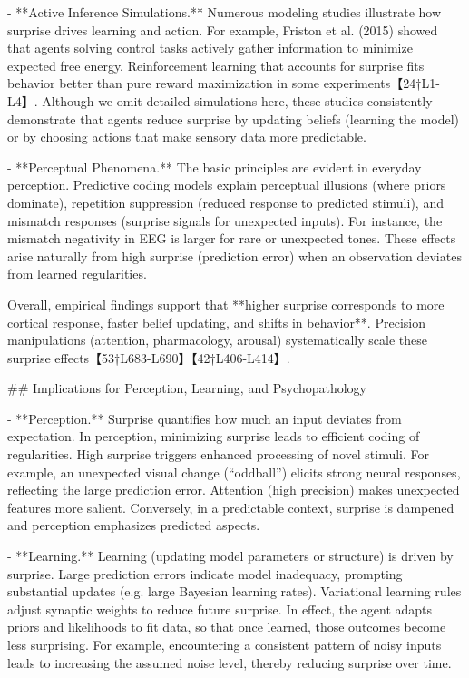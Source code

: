 \documentclass[a4paper]{article}
\begin{document}
    - **Active Inference Simulations.**  Numerous modeling studies illustrate how surprise drives learning and action.  For example, Friston et al. (2015) showed that agents solving control tasks actively gather information to minimize expected free energy.  Reinforcement learning that accounts for surprise fits behavior better than pure reward maximization in some experiments【24†L1-L4】.  Although we omit detailed simulations here, these studies consistently demonstrate that agents reduce surprise by updating beliefs (learning the model) or by choosing actions that make sensory data more predictable.
    
    - **Perceptual Phenomena.**  The basic principles are evident in everyday perception.  Predictive coding models explain perceptual illusions (where priors dominate), repetition suppression (reduced response to predicted stimuli), and mismatch responses (surprise signals for unexpected inputs).  For instance, the mismatch negativity in EEG is larger for rare or unexpected tones.  These effects arise naturally from high surprise (prediction error) when an observation deviates from learned regularities.
    
    Overall, empirical findings support that **higher surprise corresponds to more cortical response, faster belief updating, and shifts in behavior**.  Precision manipulations (attention, pharmacology, arousal) systematically scale these surprise effects【53†L683-L690】【42†L406-L414】.
    
    ## Implications for Perception, Learning, and Psychopathology
    
    - **Perception.**  Surprise quantifies how much an input deviates from expectation.  In perception, minimizing surprise leads to efficient coding of regularities.  High surprise triggers enhanced processing of novel stimuli.  For example, an unexpected visual change (“oddball”) elicits strong neural responses, reflecting the large prediction error.  Attention (high precision) makes unexpected features more salient.  Conversely, in a predictable context, surprise is dampened and perception emphasizes predicted aspects.
    
    - **Learning.**  Learning (updating model parameters or structure) is driven by surprise.  Large prediction errors indicate model inadequacy, prompting substantial updates (e.g. large Bayesian learning rates).  Variational learning rules adjust synaptic weights to reduce future surprise.  In effect, the agent adapts priors and likelihoods to fit data, so that once learned, those outcomes become less surprising.  For example, encountering a consistent pattern of noisy inputs leads to increasing the assumed noise level, thereby reducing surprise over time.
    
\end{document}

